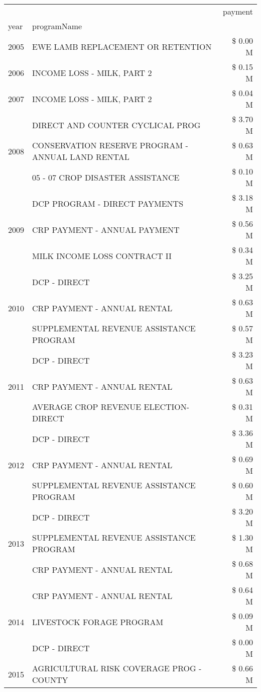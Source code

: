 \begin{tabular}{llr}
\toprule
 &  & payment \\
year & programName &  \\
\midrule
2005 & EWE LAMB REPLACEMENT OR RETENTION & \$ 0.00 M \\
\cline{1-3}
2006 & INCOME LOSS - MILK, PART 2 & \$ 0.15 M \\
\cline{1-3}
2007 & INCOME LOSS - MILK, PART 2 & \$ 0.04 M \\
\cline{1-3}
\multirow[t]{3}{*}{2008} & DIRECT AND COUNTER CYCLICAL PROG & \$ 3.70 M \\
 & CONSERVATION RESERVE PROGRAM - ANNUAL LAND RENTAL & \$ 0.63 M \\
 & 05 - 07 CROP DISASTER ASSISTANCE & \$ 0.10 M \\
\cline{1-3}
\multirow[t]{3}{*}{2009} & DCP PROGRAM - DIRECT PAYMENTS & \$ 3.18 M \\
 & CRP PAYMENT - ANNUAL PAYMENT & \$ 0.56 M \\
 & MILK INCOME LOSS CONTRACT II & \$ 0.34 M \\
\cline{1-3}
\multirow[t]{3}{*}{2010} & DCP - DIRECT & \$ 3.25 M \\
 & CRP PAYMENT - ANNUAL RENTAL & \$ 0.63 M \\
 & SUPPLEMENTAL REVENUE ASSISTANCE PROGRAM & \$ 0.57 M \\
\cline{1-3}
\multirow[t]{3}{*}{2011} & DCP - DIRECT & \$ 3.23 M \\
 & CRP PAYMENT - ANNUAL RENTAL & \$ 0.63 M \\
 & AVERAGE CROP REVENUE ELECTION-DIRECT & \$ 0.31 M \\
\cline{1-3}
\multirow[t]{3}{*}{2012} & DCP - DIRECT & \$ 3.36 M \\
 & CRP PAYMENT - ANNUAL RENTAL & \$ 0.69 M \\
 & SUPPLEMENTAL REVENUE ASSISTANCE PROGRAM & \$ 0.60 M \\
\cline{1-3}
\multirow[t]{3}{*}{2013} & DCP - DIRECT & \$ 3.20 M \\
 & SUPPLEMENTAL REVENUE ASSISTANCE PROGRAM & \$ 1.30 M \\
 & CRP PAYMENT - ANNUAL RENTAL & \$ 0.68 M \\
\cline{1-3}
\multirow[t]{3}{*}{2014} & CRP PAYMENT - ANNUAL RENTAL & \$ 0.64 M \\
 & LIVESTOCK FORAGE PROGRAM & \$ 0.09 M \\
 & DCP - DIRECT & \$ 0.00 M \\
\cline{1-3}
\multirow[t]{3}{*}{2015} & AGRICULTURAL RISK COVERAGE PROG - COUNTY & \$ 0.66 M \\

\end{tabular}
